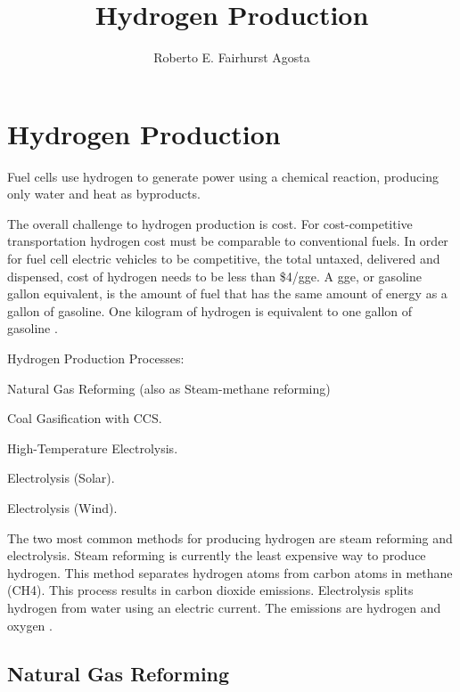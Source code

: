 \documentclass[11pt,letterpaper]{article}
\title{Hydrogen Production}
\author{Roberto E. Fairhurst Agosta}
\begin{document}

\section{Hydrogen Production}

Fuel cells use hydrogen to generate power using a chemical reaction, producing only water and heat as byproducts. 

The overall challenge to hydrogen production is cost. For cost-competitive transportation hydrogen cost must be comparable to conventional fuels. In order for fuel cell electric vehicles to be competitive, the total untaxed, delivered and dispensed, cost of hydrogen needs to be less than \$4/gge. A gge, or gasoline gallon equivalent, is the amount of fuel that has the same amount of energy as a gallon of gasoline. One kilogram of hydrogen is equivalent to one gallon of gasoline \cite{noauthor_hydrogen_nodate}.

Hydrogen Production Processes: 
\begin{description}[font=$\bullet$\scshape\bfseries]
	\item[] Natural Gas Reforming (also as Steam-methane reforming)
	\item[] Coal Gasification with CCS.
	\item[] High-Temperature Electrolysis.
	\item[] Electrolysis (Solar).
	\item[] Electrolysis (Wind).
\end{description}

The two most common methods for producing hydrogen are steam reforming and electrolysis.
Steam reforming is currently the least expensive way to produce hydrogen. This method separates hydrogen atoms from carbon atoms in methane (CH4). This process results in carbon dioxide emissions.
Electrolysis splits hydrogen from water using an electric current. The emissions are hydrogen and oxygen \cite{noauthor_production_2019}. 

\subsection{Natural Gas Reforming}
\end{document}
